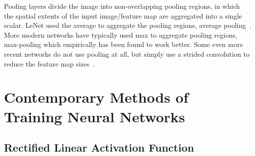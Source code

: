 \documentclass[thesis]{subfiles}
\begin{document}
Pooling layers divide the image into non-overlapping pooling regions, in which the spatial extents of the input image/feature map are aggregated into a single scalar. LeNet used the average to aggregate the pooling regions, \ie average pooling~\citep{Lecun1998}. More modern networks have typically used max to aggregate pooling regions, \ie max-pooling which empirically has been found to work better. Some even more recent networks do not use pooling at all, but simply use a strided convolution to reduce the feature map sizes~\citep{He2015}.

\section{Contemporary Methods of Training Neural Networks}
\label{section:contemporary}
\subsection{Rectified Linear Activation Function}
\label{section:relu}
\end{document}
